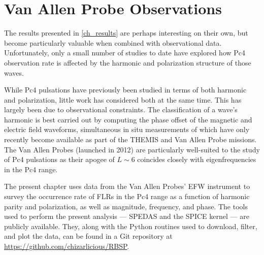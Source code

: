 


\chapter{Van Allen Probe Observations}
  \label{ch_rbsp}

The results presented in \cref{ch_results} are perhaps interesting on their own, but become particularly valuable when combined with observational data. Unfortunately, only a small number of studies to date have explored how Pc4 observation rate is affected by the harmonic and polarization structure of those waves. 

While Pc4 pulsations have previously been studied in terms of both harmonic\cite{arthur_1981,cummings_1969,engebretson_1988,hughes_1978,singer_1982,takahashi_1984} and polarization\cite{anderson_1990,dai_2015,dai_2013,kokubun_1989,liu_2009}, little work has considered both at the same time. This has largely been due to observational constraints. The classification of a wave's harmonic is best carried out by computing the phase offset of the magnetic and electric field waveforms, simultaneous in situ measurements of which have only recently become available as part of the THEMIS\cite{angelopoulos_2008} and Van Allen Probe\cite{stratton_2012} missions. The Van Allen Probes (launched in 2012) are particularly well-suited to the study of Pc4 pulsations as their apogee of $L \sim 6$ coincides closely with eigenfrequencies in the Pc4 range. 

The present chapter uses data from the Van Allen Probes' EFW instrument\cite{wygant_2013} to survey the occurrence rate of FLRs in the Pc4 range as a function of harmonic parity and polarization, as well as magnitude, frequency, and phase. The tools used to perform the present analysis --- SPEDAS and the SPICE kernel --- are publicly available. They, along with the Python routines used to download, filter, and plot the data, can be found in a Git repository at \url{https://github.com/chizarlicious/RBSP}. 




